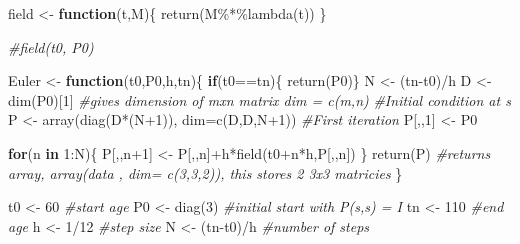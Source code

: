 \documentclass[
]{article}
\newenvironment{Shaded}{\begin{snugshade}}{\end{snugshade}}
\newcommand{\AttributeTok}[1]{\textcolor[rgb]{0.77,0.63,0.00}{#1}}
\newcommand{\CommentTok}[1]{\textcolor[rgb]{0.56,0.35,0.01}{\textit{#1}}}
\newcommand{\ControlFlowTok}[1]{\textcolor[rgb]{0.13,0.29,0.53}{\textbf{#1}}}
\newcommand{\DecValTok}[1]{\textcolor[rgb]{0.00,0.00,0.81}{#1}}
\newcommand{\FunctionTok}[1]{\textcolor[rgb]{0.00,0.00,0.00}{#1}}
\newcommand{\NormalTok}[1]{#1}
\newcommand{\OtherTok}[1]{\textcolor[rgb]{0.56,0.35,0.01}{#1}}
\newcommand{\SpecialCharTok}[1]{\textcolor[rgb]{0.00,0.00,0.00}{#1}}
\begin{document}
\begin{Shaded}
\begin{Highlighting}[]
\NormalTok{field }\OtherTok{\textless{}{-}} \ControlFlowTok{function}\NormalTok{(t,M)\{}
  \FunctionTok{return}\NormalTok{(M}\SpecialCharTok{\%*\%}\FunctionTok{lambda}\NormalTok{(t))}
\NormalTok{\}}

\CommentTok{\#field(t0, P0)}

\NormalTok{Euler }\OtherTok{\textless{}{-}} \ControlFlowTok{function}\NormalTok{(t0,P0,h,tn)\{}
  \ControlFlowTok{if}\NormalTok{(t0}\SpecialCharTok{==}\NormalTok{tn)\{ }\FunctionTok{return}\NormalTok{(P0)\}}
\NormalTok{  N }\OtherTok{\textless{}{-}}\NormalTok{ (tn}\SpecialCharTok{{-}}\NormalTok{t0)}\SpecialCharTok{/}\NormalTok{h}
\NormalTok{  D }\OtherTok{\textless{}{-}} \FunctionTok{dim}\NormalTok{(P0)[}\DecValTok{1}\NormalTok{] }\CommentTok{\#gives dimension of mxn matrix dim = c(m,n)}
  \CommentTok{\#Initial condition at s}
\NormalTok{  P }\OtherTok{\textless{}{-}} \FunctionTok{array}\NormalTok{(}\FunctionTok{diag}\NormalTok{(D}\SpecialCharTok{*}\NormalTok{(N}\SpecialCharTok{+}\DecValTok{1}\NormalTok{)), }\AttributeTok{dim=}\FunctionTok{c}\NormalTok{(D,D,N}\SpecialCharTok{+}\DecValTok{1}\NormalTok{))}
  \CommentTok{\#First iteration}
\NormalTok{  P[,,}\DecValTok{1}\NormalTok{] }\OtherTok{\textless{}{-}}\NormalTok{ P0}
  
  
  \ControlFlowTok{for}\NormalTok{(n }\ControlFlowTok{in} \DecValTok{1}\SpecialCharTok{:}\NormalTok{N)\{}
\NormalTok{    P[,,n}\SpecialCharTok{+}\DecValTok{1}\NormalTok{] }\OtherTok{\textless{}{-}}\NormalTok{ P[,,n]}\SpecialCharTok{+}\NormalTok{h}\SpecialCharTok{*}\FunctionTok{field}\NormalTok{(t0}\SpecialCharTok{+}\NormalTok{n}\SpecialCharTok{*}\NormalTok{h,P[,,n])}
\NormalTok{  \}}
  \FunctionTok{return}\NormalTok{(P) }\CommentTok{\#returns array, array(data , dim= c(3,3,2)), this stores 2 3x3 matricies}
\NormalTok{\}}

\NormalTok{t0 }\OtherTok{\textless{}{-}} \DecValTok{60}       \CommentTok{\#start age}
\NormalTok{P0 }\OtherTok{\textless{}{-}} \FunctionTok{diag}\NormalTok{(}\DecValTok{3}\NormalTok{)  }\CommentTok{\#initial start with P(s,s) = I}
\NormalTok{tn }\OtherTok{\textless{}{-}} \DecValTok{110}      \CommentTok{\#end age}
\NormalTok{h }\OtherTok{\textless{}{-}} \DecValTok{1}\SpecialCharTok{/}\DecValTok{12}      \CommentTok{\#step size }
\NormalTok{N }\OtherTok{\textless{}{-}}\NormalTok{ (tn}\SpecialCharTok{{-}}\NormalTok{t0)}\SpecialCharTok{/}\NormalTok{h }\CommentTok{\#number of steps}


\end{Highlighting}
\end{Shaded}
\end{document}
